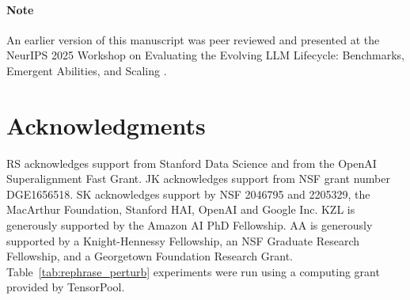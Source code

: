 \paragraph{Note} An earlier version of this manuscript was peer reviewed and presented at the NeurIPS 2025 Workshop on Evaluating the Evolving LLM Lifecycle: Benchmarks, Emergent Abilities, and Scaling \citep{schaeffer2025causally}.

\section{Acknowledgments}

RS acknowledges support from Stanford Data Science and from the OpenAI Superalignment Fast Grant. JK acknowledges support from NSF grant number DGE1656518. SK acknowledges support by NSF 2046795 and 2205329, the
MacArthur Foundation, Stanford HAI, OpenAI and Google Inc. KZL is generously supported by the Amazon AI PhD Fellowship. AA is generously supported by a Knight-Hennessy Fellowship, an NSF Graduate Research Fellowship, and a Georgetown Foundation Research Grant.
Table~\ref{tab:rephrase_perturb} experiments were run using a computing grant provided by TensorPool.